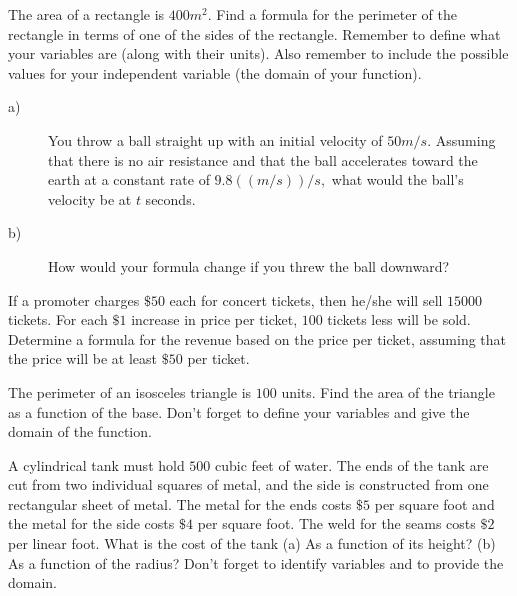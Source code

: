 \begin{ProblemSection}
  \begin{problem}{}
    The area of a rectangle is $400 m^2.$  Find a formula for the
    perimeter of the rectangle in terms of one of the sides of the
    rectangle.  Remember to define what your variables are (along with
    their units).  Also remember to include the possible values for
    your independent variable (the domain of your function).
  \end{problem}
  \begin{problem}{}
    \begin{description}
    \item[a)] You throw a ball straight up with an initial velocity of
      $50 m/s.$ Assuming that there is no air resistance and that the
      ball accelerates toward the earth at a constant rate of
      $9.8 ((m/s))/s,$ what would the ball's velocity be at $t$
      seconds.
   \item[b)] How would your formula change if you threw the ball
     downward?
    \end{description}
  \end{problem}
  \begin{problem}{}
    If a promoter charges $\$50$ each for concert tickets, then he/she
    will sell $15000$ tickets.  For each $\$1$ increase in price per
    ticket, $100$ tickets less will be sold.  Determine a formula for
    the revenue based on the price per ticket, assuming that the price
    will be at least $\$50$ per ticket.
  \end{problem}
  \begin{problem}{}
    The perimeter of an isosceles triangle is $100$ units.  Find the
    area of the triangle as a function of the base.  Don't forget to
    define your variables and give the domain of the function.
  \end{problem}
  \begin{problem}{}
    A cylindrical tank must hold $500$ cubic feet of water.  The ends of
    the tank are cut from two individual squares of metal, and the
    side is constructed from one rectangular sheet of metal.  The
    metal for the ends costs $\$5$ per square foot and the metal for the
    side costs $\$4$ per square foot.  The weld for the seams costs $\$2$
    per linear foot.  What is the cost of the tank (a) As a function of
    its height?  (b)  As a function of the radius?  Don't forget
    to identify variables and to provide the domain.
  \end{problem}

\end{ProblemSection}
